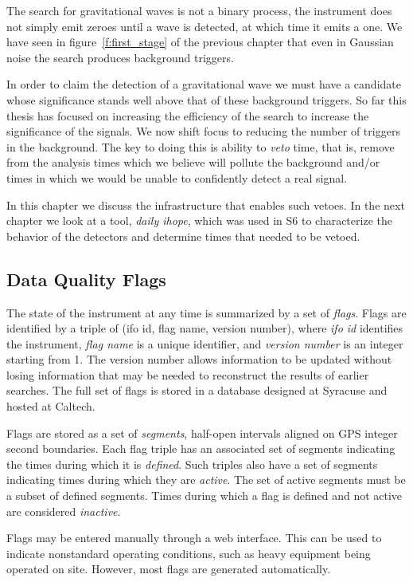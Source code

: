 The search for gravitational waves is not a binary process, the
instrument does not simply emit zeroes until a wave is detected, at
which time it emits a one.  We have seen in figure~\ref{f:first_stage}
of the previous chapter that even in Gaussian noise the search
produces background triggers.

In order to claim the detection of a gravitational wave we must have a
candidate whose significance stands well above that of these
background triggers.  So far this thesis has focused on increasing 
the efficiency of the search to increase the significance of the 
signals.  We now shift focus to reducing the number of triggers in the
background.  The key to doing this is ability to \emph{veto} time,
that is, remove from the analysis times which we believe will pollute
the background and/or times in which we would be unable to confidently
detect a real signal.

In this chapter we discuss the infrastructure that enables such
vetoes.  In the next chapter we look at a tool, \emph{daily ihope},
which was used in S6 to characterize the behavior of the detectors and
determine times that needed to be vetoed.


\subsection{Data Quality Flags}

The state of the instrument at any time is summarized by a set of
\emph{flags}.  Flags are identified by a triple of (ifo id, flag name,
version number), where \emph{ifo id} identifies the instrument,
\emph{flag name} is a unique identifier, and \emph{version number} is
an integer starting from 1.  The version number allows information to
be updated without losing information that may be needed to
reconstruct the results of earlier searches.  The full set of flags is
stored in a database designed at Syracuse and hosted at Caltech.

Flags are stored as a set of \emph{segments}, half-open intervals
aligned on GPS integer second boundaries.  Each flag triple has an
associated set of segments indicating the times during which it is
\emph{defined}.  Such triples also have a set of segments indicating
times during which they are \emph{active}.  The set of active segments
must be a subset of defined segments.  Times during which a flag is
defined and not active are considered \emph{inactive}.

Flags may be entered manually through a web interface.  This can be
used to indicate nonstandard operating conditions, such as heavy
equipment being operated on site.  However, most flags are generated
automatically.

